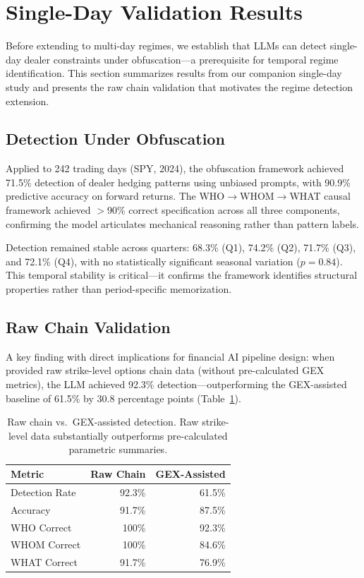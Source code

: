\section{Single-Day Validation Results}
\label{sec:single_day}

Before extending to multi-day regimes, we establish that LLMs can detect single-day dealer constraints under obfuscation---a prerequisite for temporal regime identification. This section summarizes results from our companion single-day study \citep{regan2025obfuscation} and presents the raw chain validation that motivates the regime detection extension.

\subsection{Detection Under Obfuscation}

Applied to 242 trading days (SPY, 2024), the obfuscation framework achieved 71.5\% detection of dealer hedging patterns using unbiased prompts, with 90.9\% predictive accuracy on forward returns. The WHO$\rightarrow$WHOM$\rightarrow$WHAT causal framework achieved $>$90\% correct specification across all three components, confirming the model articulates mechanical reasoning rather than pattern labels.

Detection remained stable across quarters: 68.3\% (Q1), 74.2\% (Q2), 71.7\% (Q3), and 72.1\% (Q4), with no statistically significant seasonal variation ($p = 0.84$). This temporal stability is critical---it confirms the framework identifies structural properties rather than period-specific memorization.

\subsection{Raw Chain Validation}
\label{subsec:raw_chain}

A key finding with direct implications for financial AI pipeline design: when provided raw strike-level options chain data (without pre-calculated GEX metrics), the LLM achieved 92.3\% detection---outperforming the GEX-assisted baseline of 61.5\% by 30.8 percentage points (Table~\ref{tab:raw_chain}).

\begin{table}[!htbp]
\centering
\caption{Raw chain vs.\ GEX-assisted detection. Raw strike-level data substantially outperforms pre-calculated parametric summaries.}
\label{tab:raw_chain}
\begin{tabular}{@{}lrr@{}}
\toprule
\textbf{Metric} & \textbf{Raw Chain} & \textbf{GEX-Assisted} \\
\midrule
Detection Rate & 92.3\% & 61.5\% \\
Accuracy & 91.7\% & 87.5\% \\
WHO Correct & 100\% & 92.3\% \\
WHOM Correct & 100\% & 84.6\% \\
WHAT Correct & 91.7\% & 76.9\% \\
\bottomrule
\end{tabular}
\end{table}


